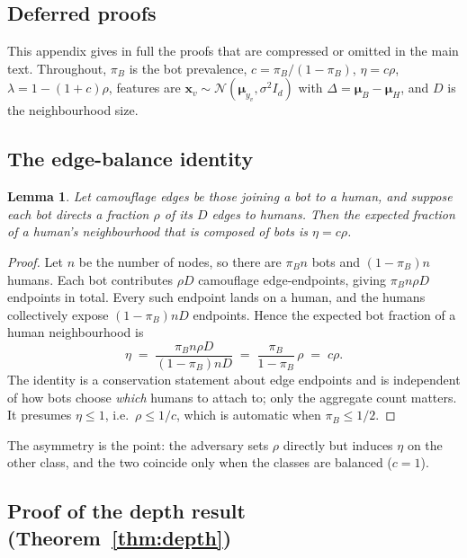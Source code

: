 \documentclass[onecolumn,pdflatex,sn-basic,Numbered]{sn-jnl}
\theoremstyle{thmstyleone}
\newtheorem{lemma}[theorem]{Lemma}
\theoremstyle{thmstylethree}
\begin{document}
\begin{appendices}

\section{Deferred proofs}
\label{app:proofs}

This appendix gives in full the proofs that are compressed or omitted in the main
text. Throughout, $\pi_B$ is the bot prevalence, $c = \pi_B/(1-\pi_B)$,
$\eta = c\rho$, $\lambda = 1-(1+c)\rho$, features are $\mathbf{x}_v \sim
\mathcal{N}(\boldsymbol\mu_{y_v}, \sigma^2 I_d)$ with
$\Delta = \boldsymbol\mu_B - \boldsymbol\mu_H$, and $D$ is the neighbourhood size.

\subsection{The edge-balance identity}
\label{app:balance}

\begin{lemma}
Let camouflage edges be those joining a bot to a human, and suppose each bot directs
a fraction $\rho$ of its $D$ edges to humans. Then the expected fraction of a
human's neighbourhood that is composed of bots is $\eta = c\rho$.
\end{lemma}

\begin{proof}
Let $n$ be the number of nodes, so there are $\pi_B n$ bots and $(1-\pi_B)n$ humans.
Each bot contributes $\rho D$ camouflage edge-endpoints, giving
$\pi_B n \rho D$ endpoints in total. Every such endpoint lands on a human, and the
humans collectively expose $(1-\pi_B) n D$ endpoints. Hence the expected bot fraction
of a human neighbourhood is
\[
    \eta \;=\; \frac{\pi_B n \rho D}{(1-\pi_B) n D}
        \;=\; \frac{\pi_B}{1-\pi_B}\,\rho \;=\; c\rho .
\]
The identity is a conservation statement about edge endpoints and is independent of
how bots choose \emph{which} humans to attach to; only the aggregate count matters.
It presumes $\eta \leq 1$, i.e.\ $\rho \leq 1/c$, which is automatic when
$\pi_B \leq 1/2$.
\end{proof}

The asymmetry is the point: the adversary sets $\rho$ directly but induces $\eta$ on
the other class, and the two coincide only when the classes are balanced ($c=1$).

\subsection{Proof of the depth result (Theorem~\ref{thm:depth})}
\label{app:depth}


\end{appendices}
\end{document}
